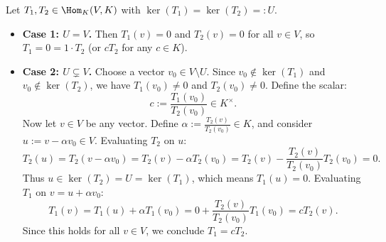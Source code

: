 \begin{exercisesolution}
\label{sol:functionals_same_kernel_proportional}
Let $T_1, T_2 \in \Hom_K(V, K)$ with $\ker(T_1) = \ker(T_2) =: U$.
\begin{itemize}
    \item \textbf{Case 1: $U = V$.}
    Then $T_1(v) = 0$ and $T_2(v) = 0$ for all $v \in V$, so $T_1 = 0 = 1 \cdot T_2$ (or $c T_2$ for any $c \in K$).

    \item \textbf{Case 2: $U \subsetneq V$.}
    Choose a vector $v_0 \in V \setminus U$. Since $v_0 \notin \ker(T_1)$ and $v_0 \notin \ker(T_2)$, we have $T_1(v_0) \ne 0$ and $T_2(v_0) \ne 0$.
    Define the scalar:
    \[
    c := \frac{T_1(v_0)}{T_2(v_0)} \in K^\times.
    \]
    Now let $v \in V$ be any vector. Define $\alpha := \frac{T_2(v)}{T_2(v_0)} \in K$, and consider $u := v - \alpha v_0 \in V$.
    Evaluating $T_2$ on $u$:
    \[
    T_2(u) = T_2(v - \alpha v_0) = T_2(v) - \alpha T_2(v_0) = T_2(v) - \frac{T_2(v)}{T_2(v_0)} T_2(v_0) = 0.
    \]
    Thus $u \in \ker(T_2) = U = \ker(T_1)$, which means $T_1(u) = 0$.
    Evaluating $T_1$ on $v = u + \alpha v_0$:
    \[
    T_1(v) = T_1(u) + \alpha T_1(v_0) = 0 + \frac{T_2(v)}{T_2(v_0)} T_1(v_0) = c T_2(v).
    \]
    Since this holds for all $v \in V$, we conclude $T_1 = c T_2$.
\end{itemize}
\end{exercisesolution}

